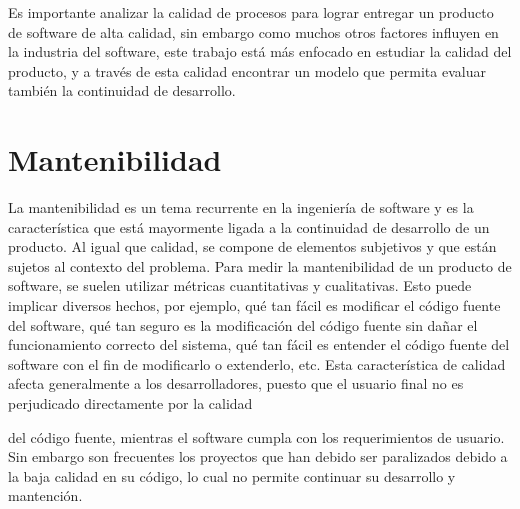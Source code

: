 Es importante analizar la calidad de procesos para lograr entregar un producto
de software de alta calidad, sin embargo como muchos otros factores influyen
en la industria del software, este trabajo está más enfocado en estudiar
la calidad del producto, y a través de esta calidad encontrar un modelo que
permita evaluar también la continuidad de desarrollo.

\section{Mantenibilidad}

La mantenibilidad es un tema recurrente en la ingeniería de software y es la característica que
está mayormente ligada a la continuidad de desarrollo de un producto.
Al igual que calidad, se compone de elementos subjetivos y que están sujetos
al contexto del problema. Para medir la mantenibilidad de un producto de
software, se suelen utilizar métricas cuantitativas y cualitativas.
Esto puede implicar diversos hechos, por ejemplo, qué tan fácil es modificar
el código fuente del software, qué tan seguro es la modificación del código
fuente sin dañar el funcionamiento correcto del sistema, qué tan fácil es entender el código
fuente del software con el fin de modificarlo o extenderlo, etc.
Esta característica de calidad afecta generalmente a los desarrolladores,
puesto que el usuario final no es perjudicado directamente por la calidad

del código fuente, mientras el software cumpla con los requerimientos de usuario.
Sin embargo son frecuentes los proyectos que han debido ser paralizados
debido a la baja calidad en su código, lo cual no permite continuar su desarrollo y mantención.
